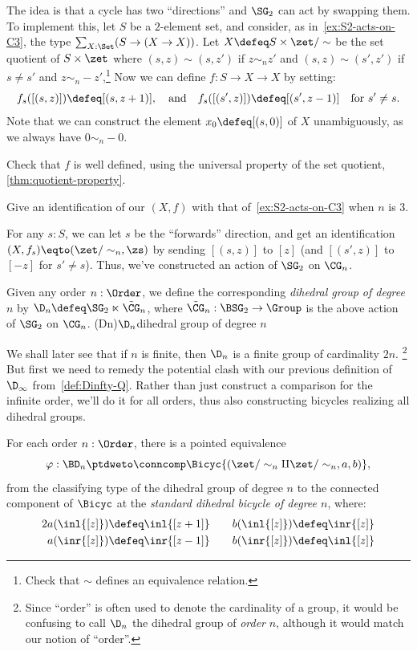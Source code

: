The idea is that a cycle has two ``directions'' and $\SG_2$ can act by
swapping them.
To implement this, let $S$ be a $2$-element set,
and consider, as in~\cref{ex:S2-acts-on-C3},
the type $\sum_{X:\Set}(S \to (X \to X))$.
Let $X \defeq S\times\zet/\sim$ be the set quotient
of $S\times\zet$ where $(s,z) \sim (s,z')$ if $z \sim_n z'$
and $(s,z) \sim (s',z')$ if $s\ne s'$ and $z \sim_n -z'$,\footnote{%
  Check that $\sim$ defines an equivalence relation.}
Now we can define $f : S \to X \to X$ by setting:
\[
  f_s([(s,z)]) \defeq [(s,z+1)], \quad\text{and}\quad
  f_s([(s',z)]) \defeq [(s',z-1)] \quad\text{for $s'\ne s$.}
\]
Note that we can construct the element $x_0\defeq [(s,0)]$
of $X$ unambiguously, as we always have $0 \sim_n -0$.
\begin{xca}
  Check that $f$ is well defined, using the universal property of the set quotient,
  \cref{thm:quotient-property}.

  Give an identification of our $(X,f)$ with that of~\cref{ex:S2-acts-on-C3}
  when $n$ is $3$.
\end{xca}
For any $s:S$, we can let $s$ be the ``forwards'' direction,
and get an identification $(X,f_s) \eqto (\zet/\sim_n,\zs)$
by sending $[(s,z)]$ to $[z]$ (and $[(s',z)]$ to $[-z]$ for $s'\ne s$).
Thus, we've constructed an action of $\SG_2$ on $\CG_n$.
\begin{definition}\label{def:gen-dihedral}
  Given any order $n:\Order$, we define the corresponding
  \emph{dihedral group of degree $n$} by $\D_n \defeq \SG_2 \ltimes \tilde\CG_n$,
  where $\tilde\CG_n : \BSG_2 \to \Group$ is the above
  action of $\SG_2$ on $\CG_n$.%
  \glossary(Dn){$\protect\D_n$}{dihedral group of degree $n$}
\end{definition}
We shall later see that if $n$ is finite,
then $\D_n$ is a finite group of cardinality $2n$.%
\footnote{Since ``order'' is often used to denote the cardinality of a group,
  it would be confusing to call $\D_n$ the dihedral group of \emph{order} $n$,
  although it would match our notion of ``order''.}
But first we need to remedy the potential clash with
our previous definition of $\D_\infty$ from~\cref{def:Dinfty-Q}.%
Rather than just construct a comparison for the infinite order,
we'll do it for all orders, thus also constructing bicycles
realizing all dihedral groups.
\begin{construction}\label{con:bidirectional-bicycle}
  For each order $n:\Order$, there is a pointed equivalence
  \[
    \varphi : \BD_n
    \ptdweto \conncomp\Bicyc{(\zet/\sim_n \amalg \zet/\sim_n, a, b)},
  \]
  from the classifying type of the dihedral group of degree $n$
  to the connected component of $\Bicyc$ at
  the \emph{standard dihedral bicycle of degree $n$}, where:
  \begin{alignat*}2
    a(\inl{[z]}) &\defeq \inl{[z+1]}\quad & b(\inl{[z]}) &\defeq \inr{[z]} \\
    a(\inr{[z]}) &\defeq \inr{[z-1]}\quad & b(\inr{[z]}) &\defeq \inl{[z]}
  \end{alignat*}
\end{construction}
